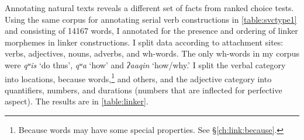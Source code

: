 Annotating natural texts reveals a different set of facts from ranked choice tests. Using the same corpus for annotating serial verb constructions in  \cref{table:svctype1} and consisting of 14167 words, I annotated for the presence and ordering of linker morphemes in linker constructions. I split data according to attachment sites: verbs, adjectives, nouns, adverbs, and wh-words. The only wh-words in my corpus were \textit{qʷis} `do thus', \textit{qʷa} `how' and \textit{ʔaaqin} `how/why.' I split the verbal category into locations, because words,\footnote{Because words may have some special properties. See \S\ref{ch:link:because}.} and others, and the adjective category into quantifiers, numbers, and durations (numbers that are inflected for perfective aspect). The results are in \cref{table:linker}.

\begin{table}[H]
\centering
\caption{Occurrence of linker constructions in naturally-occurring Nuuchahnulth}
\label{table:linker}
\end{table}
